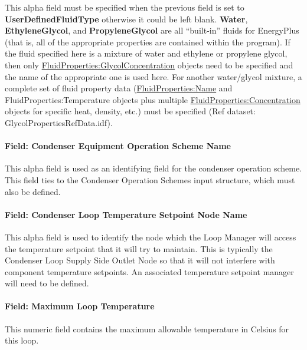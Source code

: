 This alpha field must be specified when the previous field is set to \textbf{UserDefinedFluidType} otherwise it could be left blank. \textbf{Water}, \textbf{EthyleneGlycol}, and \textbf{PropyleneGlycol} are all ``built-in'' fluids for EnergyPlus (that is, all of the appropriate properties are contained within the program). If the fluid specified here is a mixture of water and ethylene or propylene glycol, then only \hyperref[fluidpropertiesglycolconcentration]{FluidProperties:GlycolConcentration} objects need to be specified and the name of the appropriate one is used here. For another water/glycol mixture, a complete set of fluid property data (\hyperref[fluidpropertiesname]{FluidProperties:Name} and FluidProperties:Temperature objects plus multiple \hyperref[fluidpropertiesconcentration]{FluidProperties:Concentration} objects for specific heat, density, etc.) must be specified (Ref dataset: GlycolPropertiesRefData.idf).

\paragraph{Field: Condenser Equipment Operation Scheme Name}\label{field-condenser-equipment-operation-scheme-name}

This alpha field is used as an identifying field for the condenser operation scheme. This field ties to the Condenser Operation Schemes input structure, which must also be defined.

\paragraph{Field: Condenser Loop Temperature Setpoint Node Name}\label{field-condenser-loop-temperature-setpoint-node-name}

This alpha field is used to identify the node which the Loop Manager will access the temperature setpoint that it will try to maintain. This is typically the Condenser Loop Supply Side Outlet Node so that it will not interfere with component temperature setpoints. An associated temperature setpoint manager will need to be defined.

\paragraph{Field: Maximum Loop Temperature}\label{field-maximum-loop-temperature-1}

This numeric field contains the maximum allowable temperature in Celsius for this loop.

